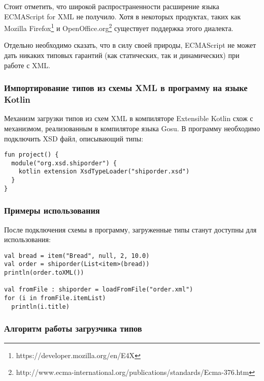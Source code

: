 Стоит отметить, что широкой распространенности расширение языка ECMAScript for XML не получило.
Хотя в некоторых продуктах, таких как Mozilla Firefox\footnote{https://developer.mozilla.org/en/E4X} и
OpenOffice.org\footnote{http://www.ecma-international.org/publications/standards/Ecma-376.htm} существует поддержка этого диалекта.

Отдельно необходимо сказать, что в силу своей природы, ECMAScript не может дать никаких типовых гарантий (как статических, так и динамических) при работе с XML.

\subsubsection{Импортирование типов из схемы XML в программу на языке Kotlin}
Механизм загрузки типов из схем XML в компиляторе Extensible Kotlin схож с механизмом, реализованным в компиляторе языка Gosu.
В программу необходимо подключить XSD файл, описывающий типы:
\begin{code}\begin{lstlisting}[caption={Подключение XML схемы в программу на языке Kotlin.}, label={xsd-type-loading-extension-point}]
fun project() {
  module("org.xsd.shiporder") {
    kotlin extension XsdTypeLoader("shiporder.xsd")
  }
}
\end{lstlisting}\end{code}

\begin{code}
\subsubsection{Примеры использования}
После подключения схемы в программу, загруженные типы станут доступны для использования:

\begin{lstlisting}[caption={Пример использования типов, загруженных из XML схемы в языке Kotlin.}, label=kotlin-simple-xml-example]
val bread = item("Bread", null, 2, 10.0)
val order = shiporder(List<item>(bread))
println(order.toXML())

val fromFile : shiporder = loadFromFile("order.xml")
for (i in fromFile.itemList)
  println(i.title)
\end{lstlisting}\end{code}

\subsubsection{Алгоритм работы загрузчика типов}


